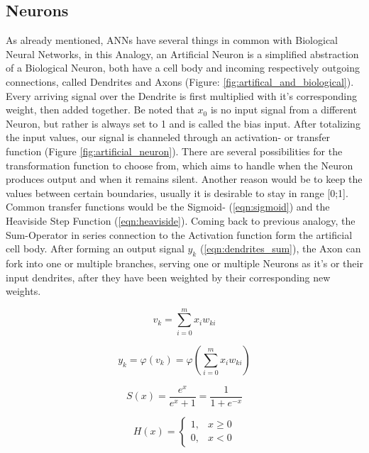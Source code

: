 \subsection{Neurons}
As already mentioned, ANNs have several things in common with Biological Neural Networks, in this Analogy, an Artificial Neuron is a simplified abstraction of a Biological Neuron, both have a cell body and incoming respectively outgoing connections, called Dendrites and Axons (Figure: \ref{fig:artifical_and_biological}). Every arriving signal over the Dendrite is first multiplied with it's corresponding weight, then added together. Be noted that $x_{0}$ is no input signal from a different Neuron, but rather is always set to 1 and is called the bias input. \newline
After totalizing the input values, our signal is channeled through an activation- or transfer function (Figure \ref{fig:artificial_neuron}). There are several possibilities for the transformation function to choose from, which aims to handle when the Neuron produces output and when it remains silent. Another reason would be to keep the values between certain boundaries, usually it is desirable to stay in range [0;1]. Common transfer functions would be the Sigmoid- (\ref{eqn:sigmoid}) and the Heaviside Step Function (\ref{eqn:heaviside}). Coming back to previous analogy, the Sum-Operator in series connection to the Activation function form the artificial cell body.\newline 
After forming an output signal $y_{k}$ (\ref{eqn:dendrites_sum}), the Axon can fork into one or multiple branches, serving one or multiple Neurons as it's or their input dendrites, after they have been weighted by their corresponding new weights.   


\begin{equation}
\label{eqn:vk}
	v_{k} = \sum_{i=0}^{m} x_{i} w_{ki}
\end{equation}  

\begin{equation}
	\label{eqn:dendrites_sum}
	y_{k} = \varphi(v_{k}) = \varphi(\sum_{i=0}^{m} x_{i} w_{ki}) 
\end{equation} 

\begin{equation}
	\label{eqn:sigmoid}
	S(x) = \frac{e^x}{e^x + 1} = \frac{1}{1 + e^{-x}}
\end{equation} 

\begin{equation}
	\label{eqn:heaviside}
	H(x)= 
	\begin{cases}
	1,& x\geq 0\\
	0,& x < 0
	\end{cases}
\end{equation}


